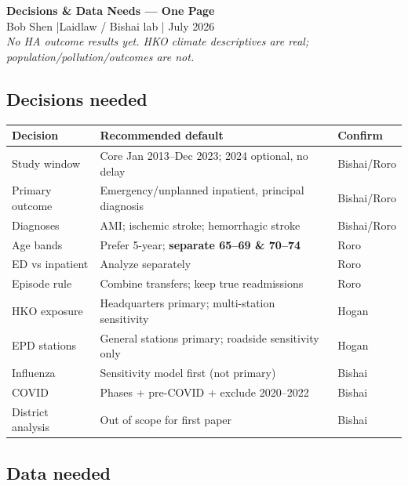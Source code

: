 \documentclass[10pt]{article}
\begin{document}
\begin{center}
{\large\bfseries Decisions \& Data Needs --- One Page}\\[0.2em]
{\small Bob Shen \quad|\quad Laidlaw / Bishai lab \quad| July 2026}\\[0.15em]
{\small\textit{No HA outcome results yet. HKO climate descriptives are real; population/pollution/outcomes are not.}}
\end{center}

\subsection*{Decisions needed}

{\footnotesize
\begin{tabular}{@{}>{\raggedright\arraybackslash}p{2.9cm}>{\raggedright\arraybackslash}p{5.4cm}>{\raggedright\arraybackslash}p{2.0cm}@{}}
\toprule
\textbf{Decision} & \textbf{Recommended default} & \textbf{Confirm} \\
\midrule
Study window & Core Jan 2013--Dec 2023; 2024 optional, no delay & Bishai/Roro \\
Primary outcome & Emergency/unplanned inpatient, principal diagnosis & Bishai/Roro \\
Diagnoses & AMI; ischemic stroke; hemorrhagic stroke & Bishai/Roro \\
Age bands & Prefer 5-year; \textbf{separate 65--69 \& 70--74} & Roro \\
ED vs inpatient & Analyze separately & Roro \\
Episode rule & Combine transfers; keep true readmissions & Roro \\
HKO exposure & Headquarters primary; multi-station sensitivity & Hogan \\
EPD stations & General stations primary; roadside sensitivity only & Hogan \\
Influenza & Sensitivity model first (not primary) & Bishai \\
COVID & Phases + pre-COVID + exclude 2020--2022 & Bishai \\
District analysis & Out of scope for first paper & Bishai \\
\bottomrule
\end{tabular}
}

\vspace{0.45em}
\subsection*{Data needed}
\end{document}
